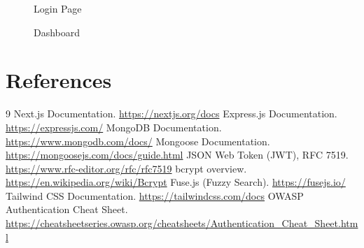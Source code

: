 \documentclass[12pt,a4paper]{report}
\begin{document}
\begin{figure}[h]
\centering
{}
\caption{Login Page}
\end{figure}

\begin{figure}[h]
\centering
{}
\caption{Dashboard}
\end{figure}

\chapter{References}
\begin{thebibliography}{9}
 Next.js Documentation. \url{https://nextjs.org/docs}
 Express.js Documentation. \url{https://expressjs.com/}
 MongoDB Documentation. \url{https://www.mongodb.com/docs/}
 Mongoose Documentation. \url{https://mongoosejs.com/docs/guide.html}
 JSON Web Token (JWT), RFC 7519. \url{https://www.rfc-editor.org/rfc/rfc7519}
 bcrypt overview. \url{https://en.wikipedia.org/wiki/Bcrypt}
 Fuse.js (Fuzzy Search). \url{https://fusejs.io/}
 Tailwind CSS Documentation. \url{https://tailwindcss.com/docs}
 OWASP Authentication Cheat Sheet. \url{https://cheatsheetseries.owasp.org/cheatsheets/Authentication_Cheat_Sheet.html}
\end{thebibliography}
\end{document}
